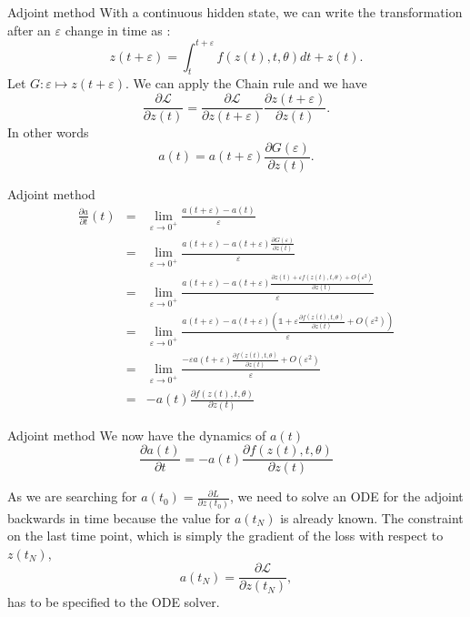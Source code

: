 \documentclass[11pt]{beamer}
\begin{document}
\begin{frame}{Adjoint method}
With a continuous hidden state, we can write the transformation after an $\varepsilon$ change in time as :
\begin{equation}
\label{zteps}
z(t+\varepsilon) = \int^{t+\varepsilon}_{t} f(z(t),t,\theta) dt + z(t).
\end{equation}
Let $ G : \varepsilon \mapsto z(t+\varepsilon)$. We can apply the Chain rule and we have 
\begin{equation*}
\frac{\partial \mathcal{L}}{\partial z(t)} = \frac{\partial \mathcal{L}}{\partial z(t+\varepsilon)} \frac{\partial z(t+\varepsilon)}{\partial z(t)}.
\end{equation*}
In other words 
\begin{equation}
\label{at}
a(t) = a(t+\varepsilon)\frac{\partial G(\varepsilon)}{\partial z(t)}.
\end{equation}
\end{frame}

\begin{frame}{Adjoint method}
\begin{eqnarray*}
\frac{\partial a}{\partial t}(t) &=& \lim_{\varepsilon \rightarrow 0^+} \frac{a(t+\varepsilon) - a(t)}{\varepsilon}\\
&=& \lim_{\varepsilon \rightarrow 0^+} \frac{a(t+\varepsilon) - a(t+\varepsilon)\frac{\partial G(\varepsilon)}{\partial z(t)}}{\varepsilon}\\
&=& \lim_{\varepsilon \rightarrow 0^+} \frac{a(t+\varepsilon) - a(t+\varepsilon)\frac{\partial z(t) + \varepsilon f(z(t),t,\theta) + O(\varepsilon^2)}{\partial z(t)}}{\varepsilon} \\
&=& \lim_{\varepsilon \rightarrow 0^+} \frac{a(t+\varepsilon) - a(t+\varepsilon)(\mathds{1} + \varepsilon \frac{\partial f(z(t),t,\theta)} {\partial z(t)}+ O(\varepsilon^2))}{\varepsilon}\\
&=& \lim_{\varepsilon \rightarrow 0^+} \frac{-\varepsilon a(t+\varepsilon) \frac{\partial f(z(t),t,\theta)} {\partial z(t)}+ O(\varepsilon^2)}{\varepsilon}\\
&=& -a(t)\frac{\partial f(z(t),t,\theta)} {\partial z(t)}
\end{eqnarray*}
\end{frame}

\begin{frame}{Adjoint method}
We now have the dynamics of $a(t)$
\begin{equation}
\label{dynat}
\frac{\partial a(t)}{\partial t} = -a(t)\frac{\partial f(z(t),t,\theta)} {\partial z(t)}
\end{equation}
 
As we are searching for $ a(t_0) = \frac{\partial L}{\partial z(t_0)}$, we need to solve an ODE for the adjoint backwards in time because the value for $a(t_N)$ is already known. The constraint on the last time point, which is simply the gradient of the loss with respect to $z(t_N)$, 
\begin{equation*}
a(t_N) = \frac{\partial \mathcal{L}}{\partial z(t_N)},
\end{equation*}
has to be specified to the ODE solver. 
\end{frame}
\end{document}
